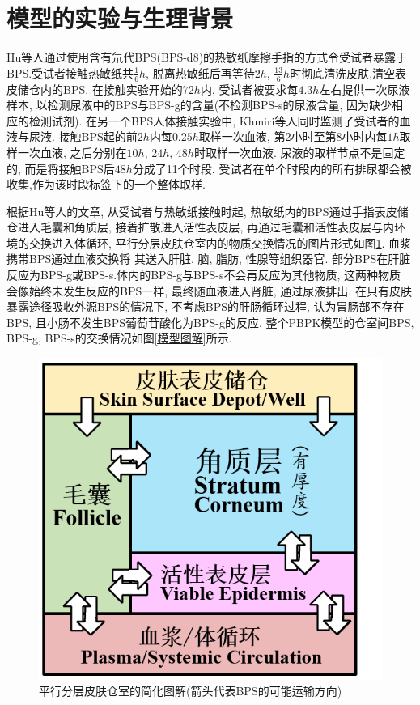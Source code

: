\documentclass[a4paper,punct=banjiao,twoside]{ctexrep}
\theoremstyle{plain}
\theoremstyle{definition}
\theoremstyle{remark}
\begin{document}
\section{模型的实验与生理背景}
Hu\cite{11}等人通过使用含有氘代BPS(BPS-d8)的热敏纸摩擦手指的方式令受试者暴露于BPS.受试者接触热敏纸共$\frac{1}{6}h$, 脱离热敏纸后再等待$2h$, $\frac{13}{6}h$时彻底清洗皮肤,清空表皮储仓内的BPS.
在接触实验开始的$72h$内, 受试者被要求每$4.3h$左右提供一次尿液样本, 以检测尿液中的BPS与BPS-g的含量(不检测BPS-s的尿液含量, 因为缺少相应的检测试剂).
在另一个BPS人体接触实验中, Khmiri等人\cite{13}同时监测了受试者的血液与尿液. 接触BPS起的前$2h$内每$0.25h$取样一次血液, 第2小时至第8小时内每$1h$取样一次血液, 之后分别在$10h$, $24h$, $48h$时取样一次血液.
尿液的取样节点不是固定的, 而是将接触BPS后$48h$分成了11个时段. 受试者在单个时段内的所有排尿都会被收集,作为该时段标签下的一个整体取样. 

根据Hu等人的文章\cite{11}, 从受试者与热敏纸接触时起, 热敏纸内的BPS通过手指表皮储仓进入毛囊和角质层, 接着扩散进入活性表皮层, 再通过毛囊和活性表皮层与内环境的交换进入体循环, 平行分层皮肤仓室内的物质交换情况的图片形式如图\ref{分层皮肤}. 血浆携带BPS通过血液交换将
其送入肝脏, 脑, 脂肪, 性腺等组织器官. 部分BPS在肝脏反应为BPS-g或BPS-s.体内的BPS-g与BPS-s不会再反应为其他物质, 这两种物质
会像始终未发生反应的BPS一样, 最终随血液进入肾脏, 通过尿液排出. 在只有皮肤暴露途径吸收外源BPS的情况下, 不考虑BPS的肝肠循环过程, 认为胃肠部不存在BPS, 且小肠不发生BPS葡萄苷酸化为BPS-g的反应. 
整个PBPK模型的仓室间BPS, BPS-g, BPS-s的交换情况如图\ref{模型图解}所示.
\begin{figure}[H]
  \centering
  \includegraphics[scale=0.6]{./figs/p1.png}
  \caption{平行分层皮肤仓室的简化图解(箭头代表BPS的可能运输方向)}
  \label{分层皮肤}
\end{figure}
\end{document}
